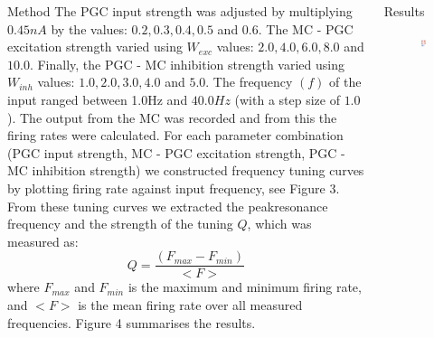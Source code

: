 \documentclass[final,hyperref={pdfpagelabels=false}]{beamer}
\begin{document}
\begin{frame}{}
\begin{columns}[t]
\begin{column}{.48\linewidth}
\begin{block}{Method}
      	The PGC input strength was adjusted by multiplying $0.45nA$ by the values: $0.2, 0.3, 0.4, 0.5$ and $0.6$. 
      	The MC - PGC excitation strength varied using $W_{exc}$ values: $2.0, 4.0, 6.0, 8.0$ and $10.0$. 
      	Finally, the PGC - MC inhibition strength varied using $W_{inh}$ values: $1.0, 2.0, 3.0, 4.0$ and $5.0$. 
		The frequency $(f)$ of the input ranged between 
		1.0Hz
		and $40.0Hz$ (with a step size of $1.0$). 
		The output from the MC was recorded and from this the firing rates were calculated. 
		For each parameter combination (PGC input strength, MC - PGC excitation strength, PGC - MC inhibition strength) we constructed frequency tuning curves by plotting firing rate against input frequency, see Figure 3. 
		From these tuning curves we extracted the peakresonance frequency and the strength of the tuning $Q$, which was measured as:
		\begin{equation}
		Q = \frac{(F_{max} - F_{min})}{<F>}
		\end{equation}
		where $F_{max}$ and $F_{min}$ is the maximum and minimum firing rate, and $<F>$ is the mean firing rate over all measured frequencies. Figure 4 summarises the results.
      \end{block}
    \end{column}
    \begin{column}{.48\linewidth}
      \begin{block}{Results}
      	\begin{figure}
      		\center
      		\includegraphics[scale=0.5]{images/Contour_plot_tuning_frequency}

\end{figure}
\end{block}
\end{column}
\end{columns}
\end{frame}
\end{document}
